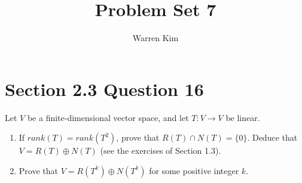 \documentclass[13pt]{article}
\title{Problem Set 7}
\author{Warren Kim}
\begin{document}
\maketitle

\newpage
\section*{Section 2.3 Question 16}
Let $V$ be a finite-dimensional vector space, and let $T : V \rightarrow V$ be linear.
\begin{enumerate}[label=(\alph*),leftmargin=*]
\item If $rank(T) = rank(T^2)$, prove that $R(T) \cap N(T) = \{ 0 \}$. Deduce that $V = R(T) \oplus N(T)$ (see the exercises of Section 1.3).
\item Prove that $V = R(T^k) \oplus N(T^k)$ for some positive integer $k$.
\end{enumerate}
\end{document}
